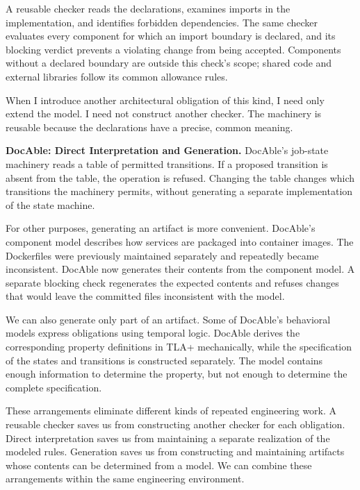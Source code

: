 A reusable checker reads the declarations, examines imports in the implementation, and identifies forbidden dependencies. The same checker evaluates every component for which an import boundary is declared, and its blocking verdict prevents a violating change from being accepted. Components without a declared boundary are outside this check's scope; shared code and external libraries follow its common allowance rules.

When I introduce another architectural obligation of this kind, I need only extend the model. I need not construct another checker. The machinery is reusable because the declarations have a precise, common meaning.

\textbf{DocAble: Direct Interpretation and Generation.} DocAble's job-state machinery reads a table of permitted transitions. If a proposed transition is absent from the table, the operation is refused. Changing the table changes which transitions the machinery permits, without generating a separate implementation of the state machine.

For other purposes, generating an artifact is more convenient. DocAble's component model describes how services are packaged into container images. The Dockerfiles were previously maintained separately and repeatedly became inconsistent. DocAble now generates their contents from the component model. A separate blocking check regenerates the expected contents and refuses changes that would leave the committed files inconsistent with the model.

We can also generate only part of an artifact. Some of DocAble's behavioral models express obligations using temporal logic. DocAble derives the corresponding property definitions in TLA+ mechanically, while the specification of the states and transitions is constructed separately. The model contains enough information to determine the property, but not enough to determine the complete specification.

These arrangements eliminate different kinds of repeated engineering work. A reusable checker saves us from constructing another checker for each obligation. Direct interpretation saves us from maintaining a separate realization of the modeled rules. Generation saves us from constructing and maintaining artifacts whose contents can be determined from a model. We can combine these arrangements within the same engineering environment.

